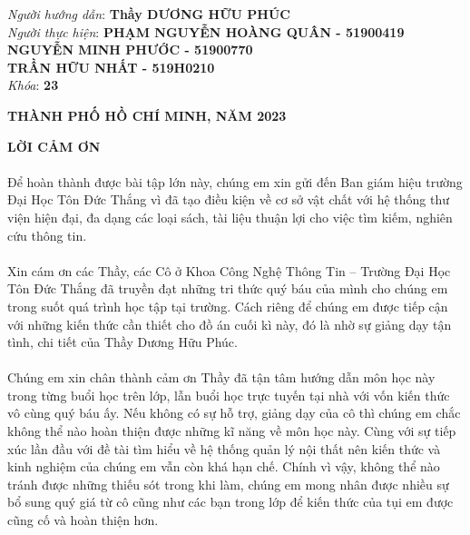 \documentclass{report}
\begin{document}
\vspace{2cm}
\begin{flushright}
	\fontsize{14}{20}\selectfont
	\textit{Người hướng dẫn}: \textbf{Thầy DƯƠNG HỮU PHÚC}\\
	
	\textit{Người thực hiện}:
	\textbf{PHẠM NGUYỄN HOÀNG QUÂN - 51900419}\\
	\textbf{NGUYỄN MINH PHƯỚC  - 51900770}\\
	\textbf{TRẦN HỮU NHẤT  - 519H0210}\\
	\textit{Khóa}: \textbf{23}\\
\end{flushright}
\vspace{4cm}
\begin{center}
	\fontsize{14}{20}\selectfont
	\textbf{THÀNH PHỐ HỒ CHÍ MINH, NĂM 2023}
\end{center}
\pagebreak
\pagestyle{fancy}
\fancyhf{}
\chead{\thepage}
\renewcommand{\headrulewidth}{0pt}
\begin{center}
	\setcounter{page}{1}
	\fontsize{16}{20}\selectfont
	\textbf{LỜI CẢM ƠN\\} 
\end{center}
	\fontsize{13}{15}\selectfont
	\paragraph{}
	Để hoàn thành được bài tập lớn này, chúng em xin gửi đến Ban giám hiệu trường Đại Học Tôn Đức Thắng vì đã tạo điều kiện về cơ sở vật chất với hệ thống thư viện hiện đại, đa dạng các loại sách, tài liệu thuận lợi cho việc tìm kiếm, nghiên cứu thông tin.
	\paragraph{}
	Xin cám ơn các Thầy, các Cô ở Khoa Công Nghệ Thông Tin – Trường Đại Học Tôn Đức Thắng đã truyền đạt những tri thức quý báu của mình cho chúng em trong suốt quá trình học tập tại trường. Cách riêng để chúng em được tiếp cận với những kiến thức cần thiết cho đồ án cuối kì này, đó là nhờ sự giảng dạy tận tình, chi tiết của Thầy Dương Hữu Phúc.
	\paragraph{}
	Chúng em xin chân thành cảm ơn Thầy đã tận tâm hướng dẫn môn học này trong từng buổi học trên lớp, lẫn buổi học trực tuyến tại nhà với vốn kiến thức vô cùng quý báu ấy. Nếu không có sự hỗ trợ, giảng dạy của cô thì chúng em chắc không thể nào hoàn thiện được những kĩ năng về môn học này. Cùng với sự tiếp xúc lần đầu với đề tài tìm hiểu về hệ thống quản lý nội thất nên kiến thức và kinh nghiệm của chúng em vẫn còn khá hạn chế. Chính vì vậy, không thể nào tránh được những thiếu sót trong khi làm, chúng em mong nhân được nhiều sự bổ sung quý giá từ cô cũng như các bạn trong lớp để kiến thức của tụi em được cũng cố và hoàn thiện hơn.
\end{document}
